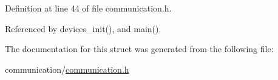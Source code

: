 Definition at line 44 of file communication.\-h.



Referenced by devices\-\_\-init(), and main().



The documentation for this struct was generated from the following file\-:\begin{DoxyCompactItemize}
\item 
communication/\hyperlink{communication_8h}{communication.\-h}\end{DoxyCompactItemize}
